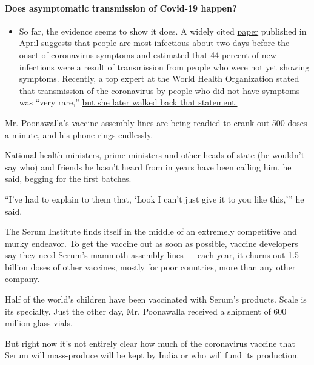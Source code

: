 \begin{itemize}
{  \paragraph{Does asymptomatic transmission of Covid-19
  happen?}\label{does-asymptomatic-transmission-of-covid-19-happen}}

  \begin{itemize}
  \tightlist
  \item
    So far, the evidence seems to show it does. A widely cited
    \href{https://www.nature.com/articles/s41591-020-0869-5}{paper}
    published in April suggests that people are most infectious about
    two days before the onset of coronavirus symptoms and estimated that
    44 percent of new infections were a result of transmission from
    people who were not yet showing symptoms. Recently, a top expert at
    the World Health Organization stated that transmission of the
    coronavirus by people who did not have symptoms was ``very rare,''
    \href{https://www.nytimes3xbfgragh.onion/2020/06/09/world/coronavirus-updates.html?action=click\&pgtype=Article\&state=default\&region=MAIN_CONTENT_3\&context=storylines_faq\#link-1f302e21}{but
    she later walked back that statement.}
  \end{itemize}
\end{itemize}

Mr. Poonawalla's vaccine assembly lines are being readied to crank out
500 doses a minute, and his phone rings endlessly.

National health ministers, prime ministers and other heads of state (he
wouldn't say who) and friends he hasn't heard from in years have been
calling him, he said, begging for the first batches.

``I've had to explain to them that, `Look I can't just give it to you
like this,''' he said.

The Serum Institute finds itself in the middle of an extremely
competitive and murky endeavor. To get the vaccine out as soon as
possible, vaccine developers say they need Serum's mammoth assembly
lines --- each year, it churns out 1.5 billion doses of other vaccines,
mostly for poor countries, more than any other company.

Half of the world's children have been vaccinated with Serum's products.
Scale is its specialty. Just the other day, Mr. Poonawalla received a
shipment of 600 million glass vials.

But right now it's not entirely clear how much of the coronavirus
vaccine that Serum will mass-produce will be kept by India or who will
fund its production.

